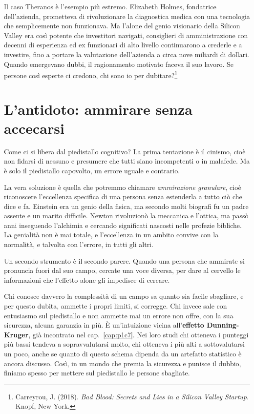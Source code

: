 Il caso Theranos \`{e} l'esempio pi\`{u} estremo. Elizabeth Holmes, fondatrice dell'azienda, prometteva di rivoluzionare la diagnostica medica con una tecnologia che semplicemente non funzionava. Ma l'alone del genio visionario della Silicon Valley era cos\`{i} potente che investitori navigati, consiglieri di amministrazione con decenni di esperienza ed ex funzionari di alto livello continuarono a crederle e a investire, fino a portare la valutazione dell'azienda a circa nove miliardi di dollari. Quando emergevano dubbi, il ragionamento motivato faceva il suo lavoro. Se persone cos\`{i} esperte ci credono, chi sono io per dubitare?\footnote{Carreyrou, J. (2018). \textit{Bad Blood: Secrets and Lies in a Silicon Valley Startup}. Knopf, New York.}

\section{L'antidoto: ammirare senza accecarsi}

Come ci si libera dal piedistallo cognitivo? La prima tentazione \`{e} il cinismo, cioè non fidarsi di nessuno e presumere che tutti siano incompetenti o in malafede. Ma \`{e} solo il piedistallo capovolto, un errore uguale e contrario.

La vera soluzione \`{e} quella che potremmo chiamare \textit{ammirazione granulare}, cioè riconoscere l'eccellenza specifica di una persona senza estenderla a tutto ci\`{o} che dice e fa. Einstein era un genio della fisica, ma secondo molti biografi fu un padre assente e un marito difficile. Newton rivoluzion\`{o} la meccanica e l'ottica, ma pass\`{o} anni inseguendo l'alchimia e cercando significati nascosti nelle profezie bibliche. La genialit\`{a} non \`{e} mai totale, e l'eccellenza in un ambito convive con la normalit\`{a}, e talvolta con l'errore, in tutti gli altri.

Un secondo strumento \`{e} il secondo parere. Quando una persona che ammirate si pronuncia fuori dal suo campo, cercate una voce diversa, per dare al cervello le informazioni che l'effetto alone gli impedisce di cercare.

Chi conosce davvero la complessit\`{a} di un campo sa quanto sia facile sbagliare, e per questo dubita, ammette i propri limiti, si corregge. Chi invece sale con entusiasmo sul piedistallo e non ammette mai un errore non offre, con la sua sicurezza, alcuna garanzia in più. \`{E} un'intuizione vicina all'\textbf{effetto Dunning-Kruger}, gi\`{a} incontrato nel cap.~\ref{cap:p1c7}. Nei loro studi chi otteneva i punteggi più bassi tendeva a sopravvalutarsi molto, chi otteneva i più alti a sottovalutarsi un poco, anche se quanto di questo schema dipenda da un artefatto statistico è ancora discusso. Cos\`{i}, in un mondo che premia la sicurezza e punisce il dubbio, finiamo spesso per mettere sul piedistallo le persone sbagliate.

